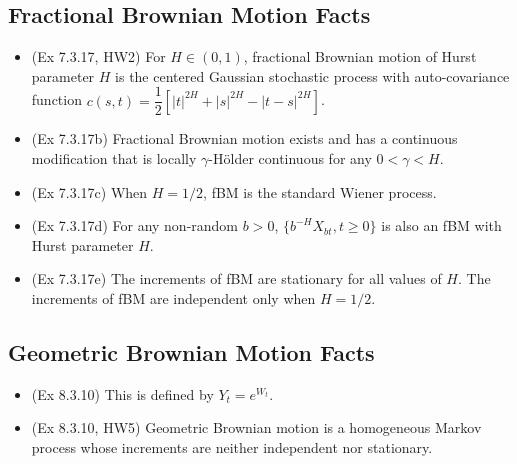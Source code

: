 \documentclass[twoside]{article}
\begin{document}
\subsection*{Fractional Brownian Motion Facts}
\begin{itemize}
\item (Ex 7.3.17, HW2) For $H \in (0,1)$, fractional Brownian motion of Hurst parameter $H$ is the centered Gaussian stochastic process with auto-covariance function $c(s, t) = \dfrac{1}{2}\left[ |t|^{2H} + |s|^{2H} - |t-s|^{2H} \right]$.

\item (Ex 7.3.17b) Fractional Brownian motion exists and has a continuous modification that is locally $\gamma$-H\"{o}lder continuous for any $0 < \gamma < H$.

\item (Ex 7.3.17c) When $H = 1/2$, fBM is the standard Wiener process.

\item (Ex 7.3.17d) For any non-random $b > 0$, $\{ b^{-H}X_{bt}, t \geq 0\}$ is also an fBM with Hurst parameter $H$.

\item (Ex 7.3.17e) The increments of fBM are stationary for all values of $H$. The increments of fBM are independent only when $H = 1/2$.

\end{itemize}

\subsection*{Geometric Brownian Motion Facts}
\begin{itemize}
\item (Ex 8.3.10) This is defined by $Y_t = e^{W_t}$.

\item (Ex 8.3.10, HW5) Geometric Brownian motion is a homogeneous Markov process whose increments are neither independent nor stationary.
\end{itemize}
\end{document}
